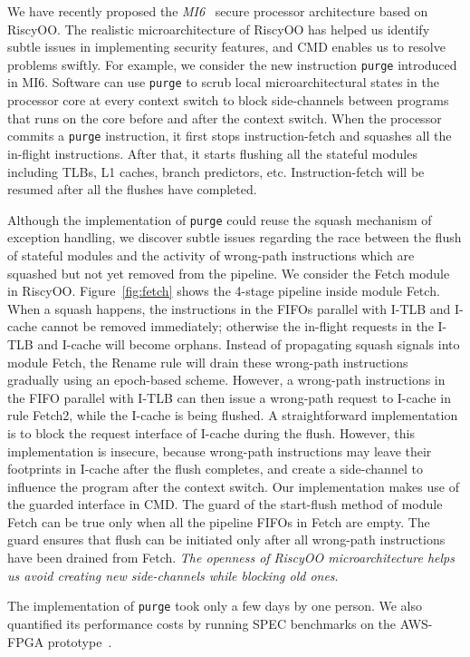 \documentclass[conference]{IEEEtran}
\newcommand{\flushInst}{\texttt{purge}\xspace}
\begin{document}
We have recently proposed the \emph{MI6}~\cite{mi6} secure processor architecture based on RiscyOO.
The realistic microarchitecture of RiscyOO has helped us identify subtle issues in implementing security features, and CMD enables us to resolve problems swiftly.
For example, we consider the new instruction \flushInst{} introduced in MI6.
Software can use \flushInst{} to scrub local microarchitectural states in the processor core at every context switch to block side-channels between programs that runs on the core before and after the context switch.
When the processor commits a \flushInst{} instruction, it first stops instruction-fetch and squashes all the in-flight instructions.
After that, it starts flushing all the stateful modules including TLBs, L1 caches, branch predictors, etc.
Instruction-fetch will be resumed after all the flushes have completed.

Although the implementation of \flushInst{} could reuse the squash mechanism of exception handling, we discover subtle issues regarding the race between the flush of stateful modules and the activity of wrong-path instructions which are squashed but not yet removed from the pipeline.
We consider the Fetch module in RiscyOO.
Figure~\ref{fig:fetch} shows the 4-stage pipeline inside module Fetch.
When a squash happens, the instructions in the FIFOs parallel with I-TLB and I-cache cannot be removed immediately; otherwise the in-flight requests in the I-TLB and I-cache will become orphans.
Instead of propagating squash signals into module Fetch, the Rename rule will drain these wrong-path instructions gradually using an epoch-based scheme.
However, a wrong-path instructions in the FIFO parallel with I-TLB can then issue a wrong-path request to I-cache in rule Fetch2, while the I-cache is being flushed.
A straightforward implementation is to block the request interface of I-cache during the flush.
However, this implementation is insecure, because wrong-path instructions may leave their footprints in I-cache after the flush completes, and create a side-channel to influence the program after the context switch.
Our implementation makes use of the guarded interface in CMD.
The guard of the start-flush method of module Fetch can be true only when all the pipeline FIFOs in Fetch are empty.
The guard ensures that flush can be initiated only after all wrong-path instructions have been drained from Fetch.
\emph{The openness of RiscyOO microarchitecture helps us avoid creating new side-channels while blocking old ones}.

The implementation of \flushInst{} took only a few days by one person.
We also quantified its performance costs by running SPEC benchmarks on the AWS-FPGA prototype~\cite{mi6}.
\end{document}
